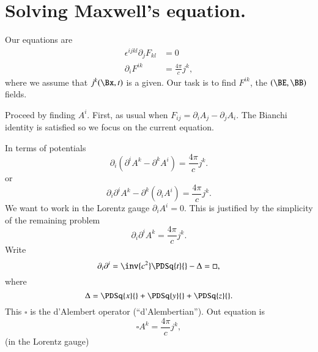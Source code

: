 %
%
\section{Solving Maxwell's equation.}

Our equations are
%
\begin{equation}\label{eqn:relativisticElectrodynamicsL17b:210}
\begin{aligned}
\epsilon^{i j k l} \partial_j F_{k l} &= 0 \\
\partial_i F^{i k} &= \frac{4 \pi}{c} j^k,
\end{aligned}
\end{equation}
%
where we assume that \(j^k(\Bx, t)\) is a given.  Our task is to find \(F^{i k}\), the \((\BE, \BB)\) fields.

Proceed by finding \(A^i\).  First, as usual when \(F_{i j} = \partial_i A_j - \partial_j A_i\).  The Bianchi identity is satisfied so we focus on the current equation.

In terms of potentials
%
\begin{equation}\label{eqn:relativisticElectrodynamicsL17b:230}
\partial_i (\partial^i A^k - \partial^k A^i) = \frac{ 4 \pi}{c} j^k.
\end{equation}
%
or
%
\begin{equation}\label{eqn:relativisticElectrodynamicsL17b:250}
\partial_i \partial^i A^k - \partial^k (\partial_i A^i) = \frac{ 4 \pi}{c} j^k.
\end{equation}
%
We want to work in the Lorentz gauge \(\partial_i A^i = 0\).  This is justified by the simplicity of the remaining problem
%
\begin{equation}\label{eqn:relativisticElectrodynamicsL17b:270}
\partial_i \partial^i A^k = \frac{4 \pi}{c} j^k.
\end{equation}
%
Write
%
\begin{equation}\label{eqn:relativisticElectrodynamicsL17b:290}
\partial_i \partial^i = \inv{c^2} \PDSq{t}{} - \Delta = \square,
\end{equation}
where
\begin{equation}\label{eqn:relativisticElectrodynamicsL17b:291}
\Delta = \PDSq{x}{} + \PDSq{y}{} + \PDSq{z}{}.
\end{equation}
This \(\square\) is the d'Alembert operator (``d'Alembertian'').
Out equation is
%
\begin{equation}\label{eqn:relativisticElectrodynamicsL17b:310}
\square A^k = \frac{4 \pi}{c} j^k,
\end{equation}
(in the Lorentz gauge)

